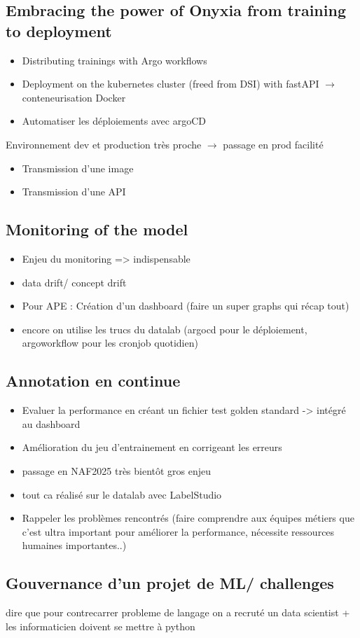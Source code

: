 \subsection{Embracing the power of Onyxia from training to deployment}

\begin{itemize}
    \item Distributing trainings with Argo workflows
    \item Deployment on the kubernetes cluster (freed from DSI) with fastAPI  $\rightarrow$ conteneurisation Docker
    \item Automatiser les déploiements avec argoCD
\end{itemize}

Environnement dev et production très proche $\rightarrow$ passage en prod facilité
\begin{itemize}
    \item Transmission d'une image
    \item Transmission d'une API
\end{itemize}

\subsection{Monitoring of the model}

\begin{itemize}
    \item Enjeu du monitoring => indispensable
    \item data drift/ concept drift
    \item Pour APE : Création d'un dashboard (faire un super graphs qui récap tout)
    \item encore on utilise les trucs du datalab (argocd pour le déploiement, argoworkflow pour les cronjob quotidien)
\end{itemize}

\subsection{Annotation en continue}

\begin{itemize}
    \item Evaluer la performance en créant un fichier test golden standard -> intégré au dashboard
    \item Amélioration du jeu d'entrainement en corrigeant les erreurs
    \item passage en NAF2025 très bientôt gros enjeu
    \item tout ca réalisé sur le datalab avec LabelStudio
    \item Rappeler les problèmes rencontrés (faire comprendre aux équipes métiers que c'est ultra important pour améliorer la performance, nécessite ressources humaines importantes..)
\end{itemize}


\subsection{Gouvernance d'un projet de ML/ challenges}

dire que pour contrecarrer probleme de langage on a recruté un data scientist + les informaticien doivent se mettre à python


